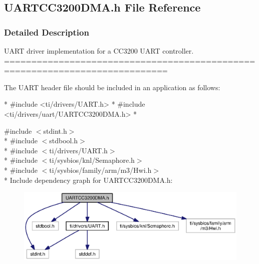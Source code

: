 \subsection{U\-A\-R\-T\-C\-C3200\-D\-M\-A.\-h File Reference}
\label{_u_a_r_t_c_c3200_d_m_a_8h}


\subsubsection{Detailed Description}
U\-A\-R\-T driver implementation for a C\-C3200 U\-A\-R\-T controller. ============================================================================

The U\-A\-R\-T header file should be included in an application as follows\-: 
\begin{DoxyCode}
*  #include <ti/drivers/UART.h>
*  #include <ti/drivers/uart/UARTCC3200DMA.h>
*  
\end{DoxyCode}
 

{\ttfamily \#include $<$stdint.\-h$>$}\\*
{\ttfamily \#include $<$stdbool.\-h$>$}\\*
{\ttfamily \#include $<$ti/drivers/\-U\-A\-R\-T.\-h$>$}\\*
{\ttfamily \#include $<$ti/sysbios/knl/\-Semaphore.\-h$>$}\\*
{\ttfamily \#include $<$ti/sysbios/family/arm/m3/\-Hwi.\-h$>$}\\*
Include dependency graph for U\-A\-R\-T\-C\-C3200\-D\-M\-A.\-h\-:
\nopagebreak
\begin{figure}[H]
\begin{center}
\leavevmode
\includegraphics[width=350pt]{_u_a_r_t_c_c3200_d_m_a_8h__incl}
\end{center}
\end{figure}
